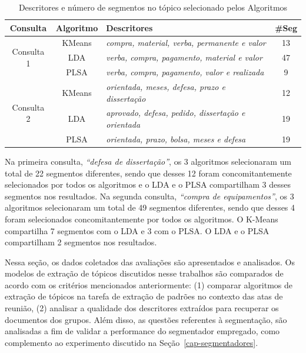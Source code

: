  
\begin{table}[!h]
 
\begin{tabular}{|c|c|l|c|}
 \hline 
 \textbf{Consulta} &\textbf{Algoritmo }& \textbf{Descritores }& \textbf{\#Seg} \\ \hline
 \multirow{3}{*}{Consulta 1} &
 KMeans & \textit{compra, material, verba, permanente e valor} & 13 \\  \cline{2-4} 
 & LDA    & \textit{verba, compra, pagamento, material e valor}  & 47 \\  \cline{2-4}
 & PLSA   & \textit{verba, compra, pagamento, valor e realizada} & 9  \\  \hline 
 \multirow{3}{*}{Consulta 2} &
 KMeans & \textit{orientada, meses, defesa, prazo e dissertação} & 12 \\  \cline{2-4}
 & LDA    & \textit{aprovado, defesa, pedido, dissertação e orientada} & 19 \\ \cline{2-4} 
 & PLSA   & \textit{orientada, prazo, bolsa, meses e defesa} & 19 \\  \hline 
 \end{tabular}  
 \label{tab:segquanti}
 \caption{Descritores e número de segmentos no tópico selecionado pelos Algoritmos}

\end{table} 

Na primeira consulta, \textit{``defesa de dissertação''},  os 3 algoritmos selecionaram um total de 22 segmentos diferentes, sendo que desses 12 foram concomitantemente selecionados por todos os algoritmos e o LDA e o PLSA compartilham 3 desses segmentos nos resultados.
Na segunda  consulta, \textit{``compra de equipamentos''}, os 3 algoritmos selecionaram um total de 49 segmentos diferentes, sendo que desses 4 foram selecionados concomitantemente por todos os algoritmos. O K-Means compartilha 7 segmentos com o LDA e 3 com o PLSA. O LDA e o PLSA compartilham 2 segmentos nos resultados.




Nessa seção, os dados coletados das avaliações são apresentados e analisados. Os modelos de extração de tópicos discutidos nesse trabalhos são comparados de acordo com os critérios mencionados anteriormente: 
(1) comparar algoritmos de extração de tópicos na tarefa de extração de padrões no contexto das atas de reunião, 
(2) analisar a qualidade dos descritores extraídos para recuperar os documentos dos grupos.
Além disso, as questões referentes à segmentação, são analisadas a fim de 
validar a performance do segmentador empregado, como complemento ao experimento discutido na Seção~\ref{cap-segmentadores}.


